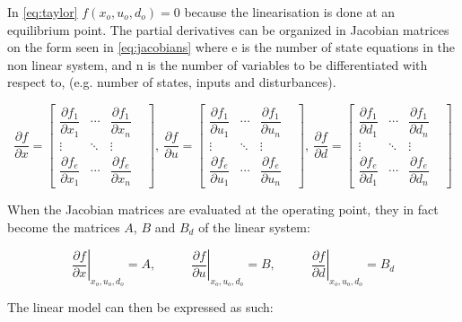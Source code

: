 In \cref{eq:taylor} $f(x_o, u_o, d_o) = 0$ because the linearisation is done at an equilibrium point. The partial derivatives can be organized in Jacobian matrices on the form seen in \cref{eq:jacobians} where e is the number of state equations in the non linear system, and n is the number of variables to be differentiated with respect to, (e.g. number of states, inputs and disturbances).

\begin{equation} \label{eq:jacobians}
	\dfrac{\partial f}{\partial x} =
		\begin{bmatrix}
			\dfrac{\partial f_1}{\partial x_1} & \cdots & \dfrac{\partial f_1}{\partial x_n} & \\
			\vdots & \ddots & \vdots & \\
			\dfrac{\partial f_e}{\partial x_1} & \cdots & \dfrac{\partial f_e}{\partial x_n} &
		\end{bmatrix}, \
	\dfrac{\partial f}{\partial u} =
		\begin{bmatrix}
			\dfrac{\partial f_1}{\partial u_1} & \cdots & \dfrac{\partial f_1}{\partial u_n} & \\
			\vdots & \ddots & \vdots & \\
			\dfrac{\partial f_e}{\partial u_1} & \cdots & \dfrac{\partial f_e}{\partial u_n} &
		\end{bmatrix}, \
	\dfrac{\partial f}{\partial d} =
		\begin{bmatrix}
			\dfrac{\partial f_1}{\partial d_1} & \cdots & \dfrac{\partial f_1}{\partial d_n} & \\
			\vdots & \ddots & \vdots & \\
			\dfrac{\partial f_e}{\partial d_1} & \cdots & \dfrac{\partial f_e}{\partial d_n} &
		\end{bmatrix}
\end{equation}

When the Jacobian matrices are evaluated at the operating point, they in fact become the matrices $ A $, $ B $ and $ B_d  $ of the linear system:

\begin{equation}
	\left. \dfrac{\partial f}{\partial x} \right |_{x_o, u_o, d_o} = A, \;\;\;\;\;\;\;\;\;\;
	\left. \dfrac{\partial f}{\partial u} \right |_{x_o, u_o, d_o} = B, \;\;\;\;\;\;\;\;\;\;
	\left. \dfrac{\partial f}{\partial d} \right |_{x_o, u_o, d_o} = B_d
\end{equation}

The linear model can then be expressed as such:

